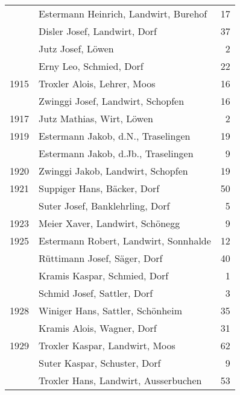 {\begin{longtable}{ l l r }
                      & Estermann Heinrich, Landwirt, Burehof     & 17          \\
                      & Disler Josef, Landwirt, Dorf              & 37          \\
                      & Jutz Josef, Löwen                         & 2           \\
                      & Erny Leo, Schmied, Dorf                   & 22          \\
        1915          & Troxler Alois, Lehrer, Moos               & 16          \\
                      & Zwinggi Josef, Landwirt, Schopfen         & 16          \\
        1917          & Jutz Mathias, Wirt, Löwen                 & 2           \\
        1919          & Estermann Jakob, d.N., Traselingen        & 19          \\
                      & Estermann Jakob, d.Jb., Traselingen       & 9           \\
        1920          & Zwinggi Jakob, Landwirt, Schopfen         & 19          \\
        1921          & Suppiger Hans, Bäcker, Dorf               & 50          \\
                      & Suter Josef, Banklehrling, Dorf           & 5           \\
        1923          & Meier Xaver, Landwirt, Schönegg           & 9           \\
        1925          & Estermann Robert, Landwirt, Sonnhalde     & 12          \\
                      & Rüttimann Josef, Säger, Dorf              & 40          \\
                      & Kramis Kaspar, Schmied, Dorf              & 1           \\
                      & Schmid Josef, Sattler, Dorf               & 3           \\
        1928          & Winiger Hans, Sattler, Schönheim          & 35          \\
                      & Kramis Alois, Wagner, Dorf                & 31          \\
        1929          & Troxler Kaspar, Landwirt, Moos            & 62          \\
                      & Suter Kaspar, Schuster, Dorf              & 9           \\
                      & Troxler Hans, Landwirt, Ausserbuchen      & 53          \\

\end{longtable}}
